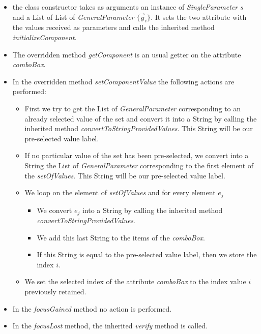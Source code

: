 \documentclass[a4paper,11pt] {ivoa}
\begin{document}
\begin{itemize}
\item the class constructor takes as arguments an instance of {\it SingleParameter} $s$ and a List of List of {\it GeneralParameter} $\{\vec g_i\}$. It sets the two attribute with the values received as parameters and calls the inherited method {\it initializeComponent}.
\item The overridden method {\it getComponent} is an usual getter on the attribute {\it comboBox}.
\item In the overridden method {\it setComponentValue} the following actions are performed:
\begin{itemize}
\item First we try to get the List of {\it GeneralParameter} corresponding to an already selected value of the set and convert it into a String by calling the inherited method {\it convertToStringProvidedValues}. This String will be our pre-selected value label.
\item If no particular value of the set has been pre-selected, we convert into a String the List of {\it GeneralParameter} corresponding to the first element of the {\it setOfValues}. This String will be our pre-selected value label.
\item We loop on the element of {\it setOfValues} and for every element $e_j$
\begin{itemize}
\item We convert $e_j$ into a String by calling the inherited method {\it convertToStringProvidedValues}.
\item We add this last String to the items of the {\it comboBox}.
\item If this String is equal to the pre-selected value label, then we store the index $i$.
\end{itemize}
\item We set the selected index of the attribute {\it comboBox} to the index value $i$ previously retained.
\end{itemize}
\item In the {\it focusGained} method no action is performed.
\item In the {\it focusLost} method, the inherited {\it verify} method is called. 
\end{itemize}
\end{document}
